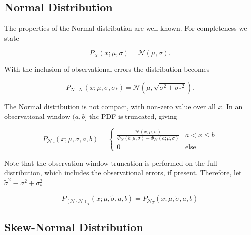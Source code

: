 \documentclass[twocolumn]{aastex631}
\newcommand{\mcal}[1]{\mathcal{#1}}
\newcommand{\sigobs}{{\sigma_*}}
\begin{document}
{    \subsection{Normal Distribution} \label{app:sub:normal_distribution}

        The properties of the Normal distribution are well known. For
        completeness we state

        \begin{equation}
            P_X(x; \mu, \sigma) = \mcal{N}(\mu, \sigma).
        \end{equation}

        With the inclusion of observational errors the distribution becomes

        \begin{equation}
            P_{\mcal{N}\cdot\mcal{N}}(x; \mu, \sigma, \sigobs) = \mcal{N}(\mu, \sqrt{\sigma^2 + \sigobs^2}).
        \end{equation}

        The Normal distribution is not compact, with non-zero value over all
        $x$. In an observational window $(a,b]$ the PDF is truncated, giving

        \begin{equation}
            P_{\mcal{N}_T}(x; \mu, \sigma, a, b) = \begin{cases}
                \frac{\mcal{N}(x, \mu, \sigma)}{\Phi_\mcal{N}(b; \mu, \sigma) - \Phi_\mcal{N}(a; \mu, \sigma)} & a < x \leq b \\
                0 & \text{else}
            \end{cases}
        \end{equation}

        Note that the observation-window-truncation is performed on the full
        distribution, which includes the observational errors, if present.
        Therefore, let $\tilde{\sigma}^2 \equiv \sigma^2+\sigma_*^2$

        \begin{equation}
            P_{(\mcal{N}\cdot\mcal{N})_T}(x; \mu, \tilde{\sigma}, a, b) = P_{\mcal{N}_T}(x; \mu, \tilde{\sigma}, a, b)
        \end{equation}

    \vspace{10pt}
    \subsection{Skew-Normal Distribution}

}
\end{document}
